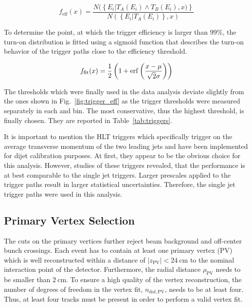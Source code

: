 \begin{equation}
\label{eq:trigger_eff}
    f_{\mathrm{eff}} (x) = \frac{N(\left\{E_i|T_A(E_i) \wedge T_B(E_i), x)\right\}}{N(\left\{ E_i | T_A(E_i)\right\} , x)}
\end{equation}

To determine the point, at which the trigger efficiency is larger than 99\%, the
turn-on distribution is fitted using a sigmoid function that describes the
turn-on behavior of the trigger paths close to the efficiency threshold.

\begin{equation}
\label{eq:trigger_eff_fit}
    f_{\mathrm{fit}} (x) = \frac{1}{2} \left( 1 + \operatorname{erf} \left(\frac{x-\mu}{\sqrt{2}\sigma}\right)\right)
\end{equation}

The thresholds which were finally used in the data analysis deviate slightly
from the ones shown in Fig.~\ref{fig:trigger_eff} as the trigger thresholds
were measured separately in each \ystar and \yboost bin. The most
conservative, thus the highest threshold, is finally chosen. They are reported in
Table~\ref{tab:triggers}.

It is important to mention the HLT triggers which specifically trigger on the
average transverse momentum of the two leading jets and have been implemented
for dijet calibration purposes. At first, they appear to be the obvious choice
for this analysis. However, studies of these triggers revealed, that the
performance is at best comparable to the single jet triggers. Larger prescales
applied to the \ptavg trigger paths result in larger statistical uncertainties.
Therefore, the single jet trigger paths were used in this analysis.

\subsection{Primary Vertex Selection}

The cuts on the primary vertices further reject beam background and off-center bunch
crossings. Each event has to contain at least one primary vertex (PV) which is well
reconstructed within a distance of $|z_\mathrm{PV}| < \SI{24}{\centi \meter}$ to
the nominal interaction point of the detector. Furthermore, the radial distance
$\rho_\mathrm{PV}$ needs to be smaller than $\SI{2}{\centi\meter}$. To
ensure a high quality of the vertex reconstruction, the number of
degrees of freedom in the vertex fit, $n_{\mathrm{dof,PV}}$, needs to be at least
four. Thus, at least four tracks must be present in order to
perform a valid vertex fit.

